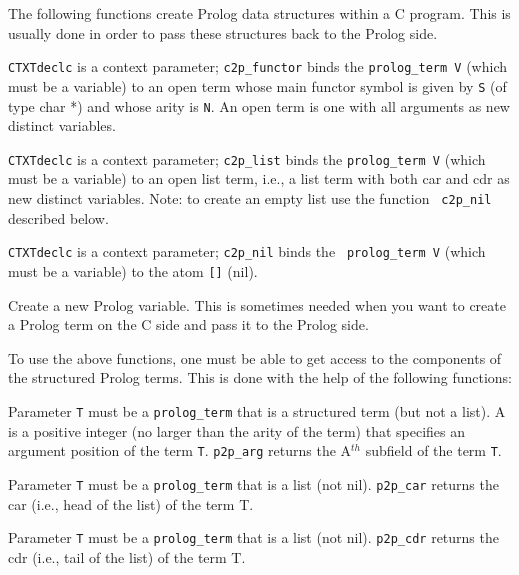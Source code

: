 The following functions create Prolog data structures within a C
program. This is usually done in order to pass these structures back to
the Prolog side.
\begin{description}
%
 {\tt CTXTdeclc} is a context parameter; {\tt c2p\_functor} binds the
 {\tt prolog\_term V} (which must be a variable) to an open term whose
 main functor symbol is given by {\tt S} (of type char *) and whose
 arity is {\tt N}.  An open term is one with all arguments as new
 distinct variables.

%
 {\tt CTXTdeclc} is a context parameter; {\tt c2p\_list} binds the
 {\tt prolog\_term V} (which must be a variable) to an open list term,
 i.e., a list term with both car and cdr as new distinct
 variables. Note: to create an empty list use the function {\tt
   c2p\_nil} described below.

%
 {\tt CTXTdeclc} is a context parameter; {\tt c2p\_nil} binds the {\tt
   prolog\_term V} (which must be a variable) to the atom \verb|[]|
 (nil).

%
Create a new Prolog variable. This is sometimes needed when you want
to create a Prolog term on the C side and pass it to the Prolog side.
\end{description}

To use the above functions, one must be able to get access to the
components of the structured Prolog terms.  This is done with the help
of the following functions:

\begin{description}
%
Parameter {\tt T} must be a {\tt prolog\_term} that is a structured
term (but not a list).  A is a positive integer (no larger than the
arity of the term) that specifies an argument position of the term
{\tt T}.  {\tt p2p\_arg} returns the A$^{th}$ subfield of the
term {\tt T}.

%
Parameter {\tt T} must be a {\tt prolog\_term} that is a list (not
nil).  {\tt p2p\_car} returns the car (i.e., head of the list)
of the term T.

%
Parameter {\tt T} must be a {\tt prolog\_term} that is a list (not
nil).  {\tt p2p\_cdr} returns the cdr (i.e., tail of the list)
of the term T.
\end{description}

